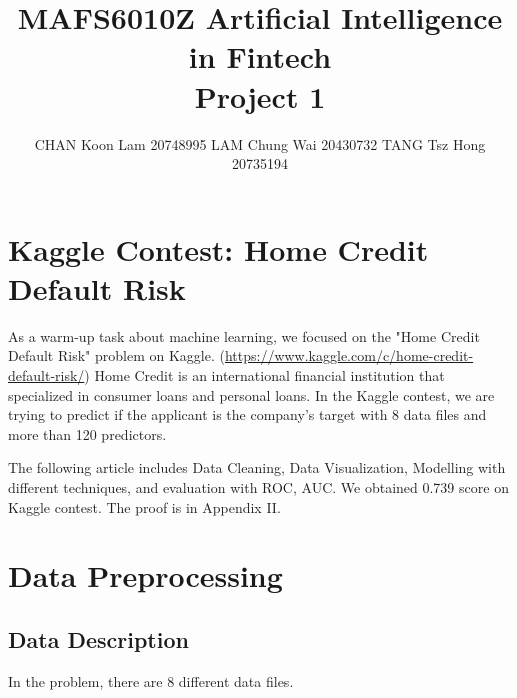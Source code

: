 \documentclass{article}
\title{MAFS6010Z Artificial Intelligence in Fintech \\ Project 1}
\author{%
  CHAN Koon Lam 20748995 \AND LAM Chung Wai 20430732 \AND TANG Tsz Hong 20735194

}
\begin{document}
\maketitle
\section{Kaggle Contest: Home Credit Default Risk}
As a warm-up task about machine learning, we focused on the "Home Credit Default Risk" problem on Kaggle. (\url{https://www.kaggle.com/c/home-credit-default-risk/}) Home Credit is an international financial institution that specialized in consumer loans and personal loans. In the Kaggle contest, we are trying to predict if the applicant is the company's target with 8 data files and more than 120 predictors.

The following article includes Data Cleaning, Data Visualization, Modelling with different techniques, and evaluation with ROC, AUC. We obtained 0.739 score on Kaggle contest. The proof is in Appendix II.

\section{Data Preprocessing}

\subsection{Data Description}

In the problem, there are 8 different data files. 
\end{document}
